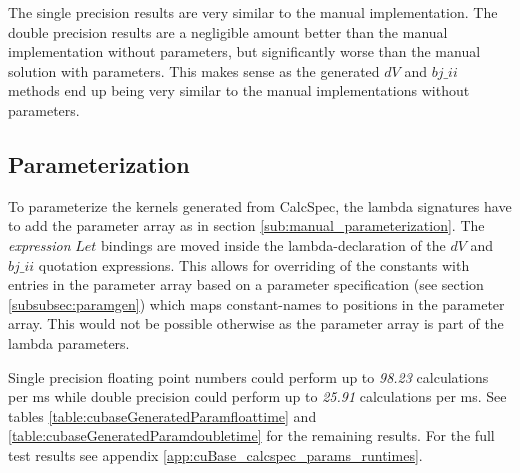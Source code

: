 The single precision results are very similar to the manual implementation.
The double precision results are a negligible amount better than the manual implementation without parameters, but significantly worse than the manual solution with parameters.
This makes sense as the generated $dV$ and $bj\_ii$ methods end up being very similar to the manual implementations without parameters.

\subsection{Parameterization}
To parameterize the kernels generated from CalcSpec, the lambda signatures have to add the parameter array as in section \ref{sub:manual_parameterization}.
The \emph{expression} $Let$ bindings are moved inside the lambda-declaration of the $dV$ and $bj\_ii$ quotation expressions.
This allows for overriding of the constants with entries in the parameter array based on a parameter specification (see section \ref{subsubsec:paramgen}) which maps constant-names to positions in the parameter array.
This would not be possible otherwise as the parameter array is part of the lambda parameters.

Single precision floating point numbers could perform up to \emph{98.23} calculations per ms while double precision could perform up to \emph{25.91} calculations per ms.
See tables \ref{table:cubaseGeneratedParamfloattime} and \ref{table:cubaseGeneratedParamdoubletime} for the remaining results.
For the full test results see appendix \ref{app:cuBase_calcspec_params_runtimes}.

\begin{table}[h!]
\centering
{}
\caption{Parameterized CalcSpec calculations per ms with single precision\label{table:cubaseGeneratedParamfloattime}}
\end{table}

